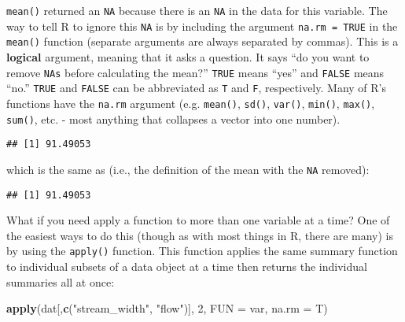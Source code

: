 \documentclass[]{book}
\newenvironment{Shaded}{\begin{snugshade}}{\end{snugshade}}
\newcommand{\KeywordTok}[1]{\textcolor[rgb]{0.13,0.29,0.53}{\textbf{#1}}}
\newcommand{\DataTypeTok}[1]{\textcolor[rgb]{0.13,0.29,0.53}{#1}}
\newcommand{\DecValTok}[1]{\textcolor[rgb]{0.00,0.00,0.81}{#1}}
\newcommand{\StringTok}[1]{\textcolor[rgb]{0.31,0.60,0.02}{#1}}
\newcommand{\OperatorTok}[1]{\textcolor[rgb]{0.81,0.36,0.00}{\textbf{#1}}}
\newcommand{\NormalTok}[1]{#1}
\theoremstyle{definition}
\theoremstyle{definition}
\theoremstyle{definition}
\theoremstyle{remark}
\begin{document}
\texttt{mean()} returned an \texttt{NA} because there is an \texttt{NA}
in the data for this variable. The way to tell R to ignore this
\texttt{NA} is by including the argument \texttt{na.rm\ =\ TRUE} in the
\texttt{mean()} function (separate arguments are always separated by
commas). This is a \textbf{logical} argument, meaning that it asks a
question. It says ``do you want to remove \texttt{NAs} before
calculating the mean?'' \texttt{TRUE} means ``yes'' and \texttt{FALSE}
means ``no.'' \texttt{TRUE} and \texttt{FALSE} can be abbreviated as
\texttt{T} and \texttt{F}, respectively. Many of R's functions have the
\texttt{na.rm} argument (e.g. \texttt{mean()}, \texttt{sd()},
\texttt{var()}, \texttt{min()}, \texttt{max()}, \texttt{sum()}, etc. -
most anything that collapses a vector into one number).

\begin{Shaded}
\end{Shaded}

\begin{verbatim}
## [1] 91.49053
\end{verbatim}

which is the same as (i.e., the definition of the mean with the
\texttt{NA} removed):

\begin{Shaded}
\end{Shaded}

\begin{verbatim}
## [1] 91.49053
\end{verbatim}

What if you need apply a function to more than one variable at a time?
One of the easiest ways to do this (though as with most things in R,
there are many) is by using the \texttt{apply()} function. This function
applies the same summary function to individual subsets of a data object
at a time then returns the individual summaries all at once:

\begin{Shaded}
\begin{Highlighting}[]
\KeywordTok{apply}\NormalTok{(dat[,}\KeywordTok{c}\NormalTok{(}\StringTok{"stream_width"}\NormalTok{, }\StringTok{"flow"}\NormalTok{)], }\DecValTok{2}\NormalTok{, }\DataTypeTok{FUN =}\NormalTok{ var, }\DataTypeTok{na.rm =}\NormalTok{ T)}
\end{Highlighting}
\end{Shaded}
\end{document}
